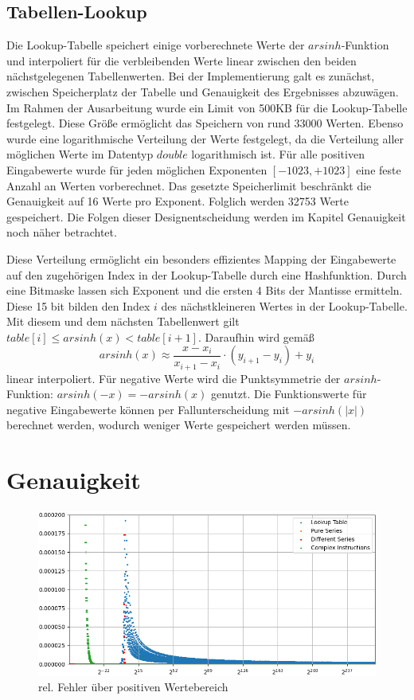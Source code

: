 \documentclass[course=erap] {aspdoc}
\begin{document}
    \subsection{Tabellen-Lookup}
    Die Lookup-Tabelle speichert einige vorberechnete Werte der $arsinh$-Funktion und interpoliert für die verbleibenden Werte linear zwischen den beiden nächstgelegenen Tabellenwerten.
    Bei der Implementierung galt es zunächst, zwischen Speicherplatz der Tabelle und Genauigkeit des Ergebnisses abzuwägen.
    Im Rahmen der Ausarbeitung wurde ein Limit von 500KB für die Lookup-Tabelle festgelegt.
    Diese Größe ermöglicht das Speichern von rund 33000 Werten.
    Ebenso wurde eine logarithmische Verteilung der Werte festgelegt, da die Verteilung aller möglichen Werte im Datentyp $double$ logarithmisch ist.
    Für alle positiven Eingabewerte wurde für jeden möglichen Exponenten $[-1023, +1023]$ eine feste Anzahl an Werten vorberechnet.
    Das gesetzte Speicherlimit beschränkt die Genauigkeit auf 16 Werte pro Exponent.
    Folglich werden 32753 Werte gespeichert.
    Die Folgen dieser Designentscheidung werden im Kapitel Genauigkeit noch näher betrachtet.

    Diese Verteilung ermöglicht ein besonders effizientes Mapping der Eingabewerte auf den zugehörigen Index in der Lookup-Tabelle durch eine Hashfunktion.
    Durch eine Bitmaske lassen sich Exponent und die ersten 4 Bits der Mantisse ermitteln.
    Diese 15 bit bilden den Index $i$ des nächstkleineren Wertes in der Lookup-Tabelle.
    Mit diesem und dem nächsten Tabellenwert gilt $table[i] \leq arsinh(x) < table[i+1]$.
    Daraufhin wird gemäß
    \[
        arsinh(x) \approx \frac{x-x_i}{x_{i+1} - x_i}\cdot (y_{i+1}-y_i) + y_i
    \]
    linear interpoliert.
    Für negative Werte wird die Punktsymmetrie der $arsinh$-Funktion: $arsinh(-x) = -arsinh(x)$ genutzt.
    Die Funktionswerte für negative Eingabewerte können per Fallunterscheidung mit $-arsinh(|x|)$ berechnet werden, wodurch weniger Werte gespeichert werden müssen.


    \section{Genauigkeit}\label{sec:genauigkeit}

    \begin{figure}[h]
        \centering
        \includegraphics[width=12cm,height=5.5cm]{images/Figure3}
        \caption{rel. Fehler über positiven Wertebereich}
    \end{figure}
\end{document}
